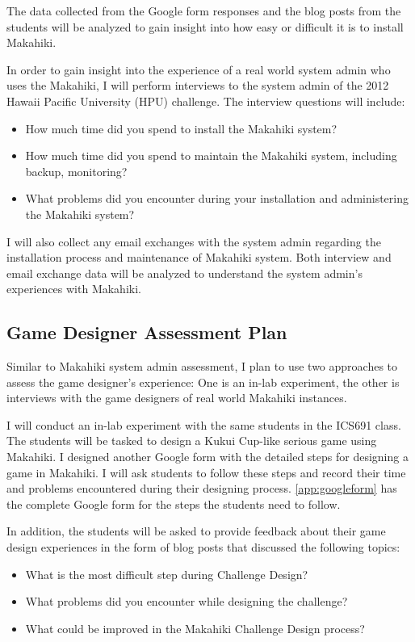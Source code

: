 The data collected from the Google form responses and the blog posts from the students will be analyzed to gain insight into how easy or difficult it is to install Makahiki. 

In order to gain insight into the experience of a real world system admin who uses the Makahiki, I will perform interviews to the system admin of the 2012 Hawaii Pacific University (HPU) challenge. The interview questions will include:
\begin{itemize}
 \item How much time did you spend to install the Makahiki system?
 \item How much time did you spend to maintain the Makahiki system, including backup, monitoring?
 \item What problems did you encounter during your installation and administering the Makahiki system?
\end{itemize}

I will also collect any email exchanges with the system admin regarding the installation process and maintenance of Makahiki system. Both interview and email exchange data will be analyzed to understand the system admin's experiences with Makahiki.  

\subsection{Game Designer Assessment Plan}

Similar to Makahiki system admin assessment, I plan to use two approaches to assess the game designer's experience: One is an in-lab experiment, the other is interviews with the game designers of real world Makahiki instances.

I will conduct an in-lab experiment with the same students in the ICS691 class. The students will be tasked to design a Kukui Cup-like serious game using Makahiki. I designed another Google form with the detailed steps for designing a game in Makahiki. I will ask students to follow these steps and record their time and problems encountered during their designing process. \autoref{app:googleform} has the complete Google form for the steps the students need to follow.

In addition, the students will be asked to provide feedback about their game design experiences in the form of blog posts that discussed the following topics:
\begin{itemize}
\item What is the most difficult step during Challenge Design?
\item What problems did you encounter while designing the challenge?
\item What could be improved in the Makahiki Challenge Design process?
\end{itemize}

